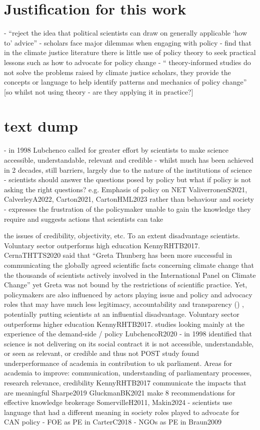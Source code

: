\section{Justification for this work}
\cite{CairneyO2020} - ``reject the idea that political scientists can draw on generally applicable `how to' advice''
\cite{CairneyO2020} - scholars face major dilemmas when engaging with policy
\cite{CairneyTS2023} - find that in the climate justice literature there is little use of policy theory to seek practical lessons such as how to advocate for policy change  - `` theory-informed studies do not solve the problems raised by climate justice scholars, they provide the concepts or language to help identify patterns and mechanics of policy change'' [so whilst not using theory - are they applying it in practice?]

\section{text dump}
\cite{LubchencoR2020} - in 1998 Lubchenco called for greater effort by scientists to make science accessible, understandable, relevant and credible - whilst much has been achieved in 2 decades, still barriers, largely due to the nature of the institutions of science
\cite{Gerber2023} - scientists should answer the questions posed by policy but what if policy is not asking the right questions? e.g. Emphasis of policy on NET ValiverronenS2021, CalverleyA2022, Carton2021, CartonHML2023 rather than behaviour and society
\cite{Bisbal2024} - expresses the frustration of the policymaker unable to gain the knowledge they require and suggests actions that scientists can take 


the issues of credibility, objectivity, etc. To an extent disadvantage scientists. Voluntary sector outperforms high education KennyRHTB2017. CernaTHTTS2020 said that ``Greta Thunberg has been more successful in communicating the globally agreed scientific facts concerning climate change that the thousands of scientists actively involved in the International Panel on Climate Change'' yet Greta was not bound by the restrictions of scientific practice. Yet, policymakers are also influenced by actors playing issue and policy and advocacy roles that may have much less legitimacy, accountability and transparency (\cite{Kingdon1993,Knaggard2015,Cairney2018,vonMalmborg2024strategies}) , potentially putting scientists at an influential disadvantage. Voluntary sector outperforms higher education KennyRHTB2017. studies looking mainly at the experience of the demand-side / policy
LubchencoR2020 - in 1998 identified that science is not delivering on its social contract it is not accessible, understandable, or seen as relevant, or credible and thus not 
POST study found underperformance of academia in contribution to uk parliament. Areas for academia to improve: communication, understanding of parliamentary processes, research relevance, credibility KennyRHTB2017  
communicate the impacts that are meaningful Sharpe2019
GluckmanBK2021 make 8 recommendations for effective knowledge brokerage
SomervilleH2011, Makin2024 - scientists use language that had a different meaning in society 
roles played to advocate for CAN policy - FOE as PE in CarterC2018 - NGOs as PE in Braun2009

